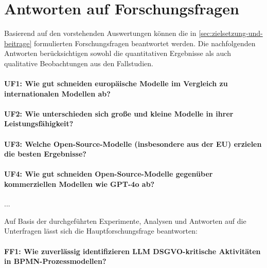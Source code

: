 \section{Antworten auf Forschungsfragen}\label{sec:antworten-auf-forschungsfragen}

Basierend auf den vorstehenden Auswertungen können die in \ref{sec:zielsetzung-und-beitrage} formulierten Forschungsfragen beantwortet werden. Die nachfolgenden Antworten berücksichtigen sowohl die quantitativen Ergebnisse als auch qualitative Beobachtungen aus den Fallstudien.

\paragraph{UF1: Wie gut schneiden europäische Modelle im Vergleich zu internationalen Modellen ab?}

\paragraph{UF2: Wie unterschieden sich große und kleine Modelle in ihrer Leistungsfähigkeit?}

\paragraph{UF3: Welche Open-Source-Modelle (insbesondere aus der EU) erzielen die besten Ergebnisse?}

\paragraph{UF4: Wie gut schneiden Open-Source-Modelle gegenüber kommerziellen Modellen wie GPT-4o ab?}

...

Auf Basis der durchgeführten Experimente, Analysen und Antworten auf die Unterfragen lässt sich die Hauptforschungsfrage beantworten:

\paragraph{FF1: Wie zuverlässig identifizieren LLM DSGVO-kritische Aktivitäten in BPMN-Prozessmodellen?}